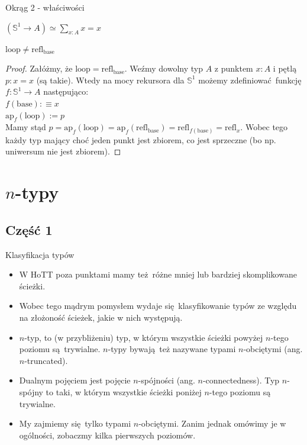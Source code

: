 \documentclass{beamer}
\newcommand{\defn}{:\equiv}
\newcommand{\refl}[1]{\text{refl}_{#1}}
\newcommand{\ap}[2]{\text{ap}_{#1}(#2)}
\newcommand{\hS}{\mathbb{S}^1}
\newcommand{\base}{\text{base}}
\newcommand{\looop}{\text{loop}}
\begin{document}
\begin{frame}{Okrąg 2 - właściwości}
	
\begin{theorem}
$(\hS \to A) \simeq \sum_{x : A} x = x$
\end{theorem}

\begin{theorem}[Lemat 6.4.1]
$\looop \neq \refl{\base}$
\end{theorem}
\begin{proof}
Załóżmy, że $\looop = \refl{\base}$. Weźmy dowolny typ $A$ z punktem $x : A$ i pętlą $p : x = x$ (są takie). Wtedy na mocy rekursora dla $\hS$ możemy zdefiniować funkcję $f : \hS \to A$ następująco: \\

$f(\base) \defn x$ \\
$\ap{f}{\looop} := p$ \\

Mamy stąd $p = \ap{f}{\looop} = \ap{f}{\refl{\base}} = \refl{f(\base)} = \refl{x}$. Wobec tego każdy typ mający choć jeden punkt jest zbiorem, co jest sprzeczne (bo np. uniwersum nie jest zbiorem).
\end{proof}

\end{frame}

\section{$n$-typy}

\subsection{Część 1}

\begin{frame}{Klasyfikacja typów}
\begin{itemize}
	\item W HoTT poza punktami mamy też różne mniej lub bardziej skomplikowane ścieżki.
	\item Wobec tego mądrym pomysłem wydaje się klasyfikowanie typów ze względu na złożoność ścieżek, jakie w nich występują.
	\item $n$-typ, to (w przybliżeniu) typ, w którym wszystkie ścieżki powyżej $n$-tego poziomu są trywialne. $n$-typy bywają też nazywane typami $n$-obciętymi (ang. $n$-truncated).
	\item Dualnym pojęciem jest pojęcie $n$-spójności (ang. $n$-connectedness). Typ $n$-spójny to taki, w którym wszystkie ścieżki poniżej $n$-tego poziomu są trywialne.
	\item My zajmiemy się tylko typami $n$-obciętymi. Zanim jednak omówimy je w ogólności, zobaczmy kilka pierwszych poziomów.
\end{itemize}
\end{frame}
\end{document}
